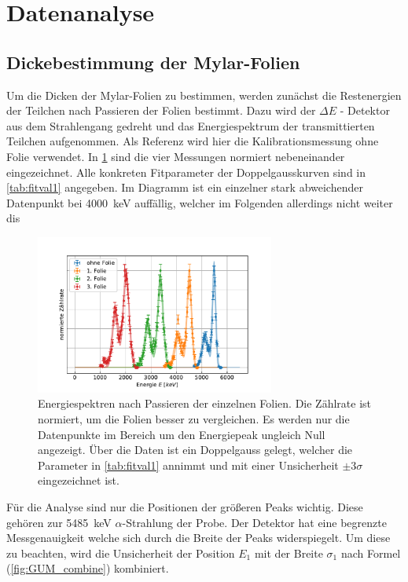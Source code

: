 \section{Datenanalyse}

\subsection{Dickebestimmung der Mylar-Folien}
\label{sec:dicke}

Um die Dicken der Mylar-Folien zu bestimmen, werden zunächst die Restenergien der Teilchen nach Passieren der Folien bestimmt.
Dazu wird der $\Delta E$ - Detektor aus dem Strahlengang gedreht und das Energiespektrum der transmittierten Teilchen aufgenommen.
Als Referenz wird hier die Kalibrationsmessung ohne Folie verwendet.
In \cref{fig:foliendicke} sind die vier Messungen normiert nebeneinander eingezeichnet.
Alle konkreten Fitparameter der Doppelgausskurven sind in \cref{tab:fitval1} angegeben.
Im Diagramm ist ein einzelner stark abweichender Datenpunkt bei \SI{4000}{\kilo\electronvolt} auffällig, welcher im Folgenden allerdings nicht weiter dis

\begin{figure}[ht]
	\centering
	\includegraphics[width=0.7\textwidth]{dat/m3_foliendicke.pdf}
	\caption{Energiespektren nach Passieren der einzelnen Folien.
			Die Zählrate ist normiert, um die Folien besser zu vergleichen.
			Es werden nur die Datenpunkte im Bereich um den Energiepeak ungleich Null angezeigt.
			Über die Daten ist ein Doppelgauss gelegt, welcher die Parameter in \cref{tab:fitval1} annimmt und mit einer Unsicherheit $\pm 3 \sigma$ eingezeichnet ist.}
	\label{fig:foliendicke}
\end{figure}

Für die Analyse sind nur die Positionen der größeren Peaks wichtig.
Diese gehören zur \SI{5485}{\kilo\electronvolt} $\alpha$-Strahlung der Probe.
Der Detektor hat eine begrenzte Messgenauigkeit welche sich durch die Breite der Peaks widerspiegelt.
Um diese zu beachten, wird die Unsicherheit der Position $E_1$ mit der Breite $\sigma_1$ nach Formel (\ref{fig:GUM_combine}) kombiniert.

